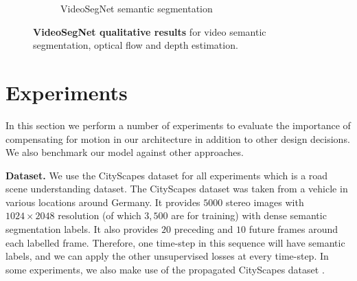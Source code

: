 \begin{figure}[t]
\begin{subfigure}[t]{\linewidth}
\begin{center}
  \caption{VideoSegNet semantic segmentation}
\end{center}
\end{subfigure}
   \caption[VideoSegNet qualitative results.]{\textbf{VideoSegNet qualitative results} for video semantic segmentation, optical flow and depth estimation.}
\label{fig:results}
\end{figure}

\section{Experiments}

In this section we perform a number of experiments to evaluate the importance of compensating for motion in our architecture in addition to other design decisions. We also benchmark our model against other approaches. 

\textbf{Dataset.} We use the CityScapes dataset for all experiments \citep{Cordts2016Cityscapes} which is a road scene understanding dataset. The CityScapes dataset was taken from a vehicle in various locations around Germany. It provides $5000$ stereo images with $1024 \times 2048$ resolution (of which $3,500$ are for training) with dense semantic segmentation labels. It also provides $20$ preceding and $10$ future frames around each labelled frame. Therefore, one time-step in this sequence will have semantic labels, and we can apply the other unsupervised losses at every time-step. In some experiments, we also make use of the propagated CityScapes dataset \citep{budvytis2017large}. 

